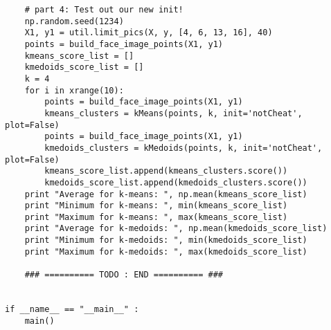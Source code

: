 \documentclass[11pt]{article}
\begin{document}
\begin{verbatim}
    # part 4: Test out our new init!
    np.random.seed(1234)
    X1, y1 = util.limit_pics(X, y, [4, 6, 13, 16], 40)
    points = build_face_image_points(X1, y1)
    kmeans_score_list = []
    kmedoids_score_list = []
    k = 4
    for i in xrange(10):
        points = build_face_image_points(X1, y1)
        kmeans_clusters = kMeans(points, k, init='notCheat', plot=False)
        points = build_face_image_points(X1, y1)
        kmedoids_clusters = kMedoids(points, k, init='notCheat', plot=False) 
        kmeans_score_list.append(kmeans_clusters.score())
        kmedoids_score_list.append(kmedoids_clusters.score())
    print "Average for k-means: ", np.mean(kmeans_score_list)
    print "Minimum for k-means: ", min(kmeans_score_list)
    print "Maximum for k-means: ", max(kmeans_score_list)
    print "Average for k-medoids: ", np.mean(kmedoids_score_list)
    print "Minimum for k-medoids: ", min(kmedoids_score_list)
    print "Maximum for k-medoids: ", max(kmedoids_score_list)
    
    ### ========== TODO : END ========== ###


if __name__ == "__main__" :
    main()
 \end{verbatim}   
 
\end{document}
